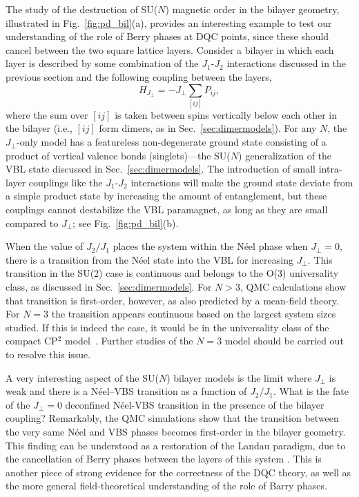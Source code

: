 \documentclass[range]{ar2e}
\begin{document}
The study of the destruction of SU($N$) magnetic order in the bilayer geometry, illustrated in Fig.~\ref{fig:pd_bil}(a), provides an interesting 
example to test our understanding of the role of Berry phases at DQC points, since these should cancel between the two square lattice layers. 
Consider a bilayer in which each layer is described by some combination of the $J_1$-$J_2$ interactions discussed in the previous section and the 
following coupling between the layers,
\begin{equation}
 H_{J_\perp} = -J_\perp \sum_{[ij]} P_{ij},
\end{equation}
where the sum over $[ij]$ is taken between spins vertically below each other in the bilayer (i.e., $[ij]$ form dimers, as in Sec.~\ref{sec:dimermodels}). For 
any $N$, the $J_\perp$-only model has a featureless non-degenerate ground state consisting of a product of vertical valence bonds (singlets)---the SU($N$)
generalization of the VBL state discussed in Sec.~\ref{sec:dimermodels}. The introduction of small intra-layer couplings like the $J_1$-$J_2$ interactions will 
make the ground state deviate from a simple product state by increasing the amount of entanglement, but these couplings cannot destabilize the VBL paramagnet,
as long as they are small compared to $J_\perp$; see Fig.~\ref{fig:pd_bil}(b). 

When the value of $J_2/J_1$ places the system within the N\'eel phase when $J_\perp=0$, there is a transition from the N\'eel state into the VBL for increasing 
$J_\perp$. This transition in the SU($2$) case is continuous and belongs to the O($3$) universality class, as discussed in Sec.~\ref{sec:dimermodels}. For $N>3$, 
QMC calculations \cite{kaul2012:sun_bil} show that transition is first-order, however, as also predicted by a mean-field theory. For $N=3$ the transition appears 
continuous based on the largest system sizes studied. If this is indeed the case, it would be in the universality class of the compact CP$^2$ model~\cite{nahum2011:loops}. 
Further studies of the $N=3$ model should be carried out to resolve this issue.

A very interesting aspect of the SU($N$) bilayer models is the limit where $J_\perp$ is weak and there is a N\'eel--VBS transition as a function of $J_2/J_1$.
What is the fate of the $J_\perp=0$ deconfined N\'eel-VBS transition in the presence of the bilayer coupling? Remarkably, the QMC simulations show that the 
transition between the very same N\'eel and VBS phases becomes first-order in the bilayer geometry. This finding can be understood as a restoration of the 
Landau paradigm, due to the cancellation of Berry phases between the layers of this system \cite{kaul2012:sun_bil}. This is another piece of strong evidence 
for the correctness of the DQC theory, as well as the more general field-theoretical understanding of the role of Barry phases.
\end{document}
